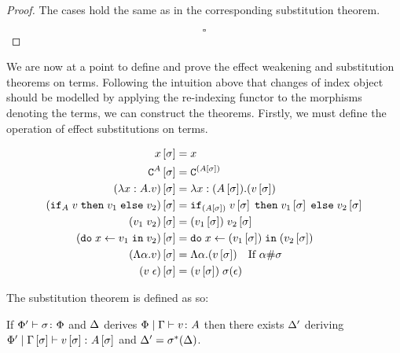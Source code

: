 \documentclass{Report}
\begin{document}
\begin{proof}
    The cases hold the same as in the corresponding substitution theorem.

    $$\square$$
\end{proof}



We are now at a point to define and prove the effect weakening and substitution theorems on terms. Following the intuition above that changes of index object should be modelled by applying the re-indexing functor to the morphisms denoting the terms, we can construct the theorems. Firstly, we must define the operation of effect substitutions on terms.

\begin{align*}
    x\left[\sigma\right] & = x \\
    \texttt{C}^{A}\left[\sigma\right] & = \texttt{C}^{(A\left[\sigma\right])} \\
    (\lambda x : A. v)\left[\sigma\right] &= \lambda x : (A\left[\sigma\right]). (v\left[\sigma\right])\\
    (\texttt{if}_{A}\; v\; \texttt{then}\; v_1 \;\texttt{else} \; v_2)\left[\sigma\right] &= \texttt{if}_{(A\left[\sigma\right])}\; v\left[\sigma\right]\; \texttt{then}\; v_1\left[\sigma\right] \;\texttt{else} \; v_2\left[\sigma\right]\\
    (v_1\; v_2)\left[\sigma\right]&= (v_1\left[\sigma\right])\; v_2\left[\sigma\right]\\
    (\texttt{do}\; x \leftarrow v_1 \;\texttt{in}\; v_2)\left[\sigma\right]&= \texttt{do}\; x \leftarrow (v_1\left[\sigma\right]) \;\texttt{in}\; (v_2\left[\sigma\right])\\
    (\Lambda \alpha. v)\left[\sigma\right] & = \Lambda \alpha. (v\left[\sigma\right])\quad\text{If $\alpha\#\sigma$}\\
    (v\;\epsilon)\left[\sigma\right] & = (v\left[\sigma\right])\;\sigma(\epsilon)\\
\end{align*}

The substitution theorem is defined as so:

\begin{theorem}
    If $\Phi' \vdash \sigma \colon \Phi$ and $\Delta$ derives $\Phi\mid\Gamma \vdash v \colon A$ then there exists $\Delta'$ deriving $\Phi'\mid\Gamma\left[\sigma\right] \vdash v\left[\sigma\right] \colon A\left[\sigma\right]$ and $\Delta' = \sigma^*(\Delta)$.
\end{theorem}
\end{document}
